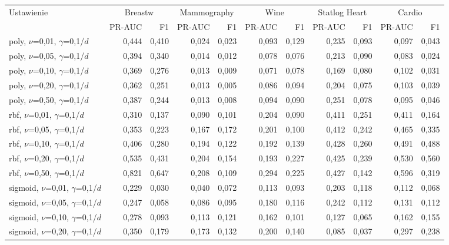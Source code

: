 \begin{longtable}{lrrrrrrrrrr}
\toprule
Ustawienie & \multicolumn{2}{c}{Breastw} & \multicolumn{2}{c}{Mammography} & \multicolumn{2}{c}{Wine} & \multicolumn{2}{c}{Statlog Heart} & \multicolumn{2}{c}{Cardio} \\
 & PR-AUC & F1 & PR-AUC & F1 & PR-AUC & F1 & PR-AUC & F1 & PR-AUC & F1 \\
\midrule
\endhead
poly, $\nu$=0,01, $\gamma$=0,1/$d$ & 0,444 & 0,410 & 0,024 & 0,023 & 0,093 & 0,129 & 0,235 & 0,093 & 0,097 & 0,043 \\
poly, $\nu$=0,05, $\gamma$=0,1/$d$ & 0,394 & 0,340 & 0,014 & 0,012 & 0,078 & 0,076 & 0,213 & 0,090 & 0,083 & 0,024 \\
poly, $\nu$=0,10, $\gamma$=0,1/$d$ & 0,369 & 0,276 & 0,013 & 0,009 & 0,071 & 0,078 & 0,169 & 0,080 & 0,102 & 0,031 \\
poly, $\nu$=0,20, $\gamma$=0,1/$d$ & 0,362 & 0,251 & 0,013 & 0,005 & 0,086 & 0,094 & 0,204 & 0,075 & 0,103 & 0,039 \\
poly, $\nu$=0,50, $\gamma$=0,1/$d$ & 0,387 & 0,244 & 0,013 & 0,008 & 0,094 & 0,090 & 0,251 & 0,078 & 0,095 & 0,046 \\
rbf, $\nu$=0,01, $\gamma$=0,1/$d$ & 0,310 & 0,137 & 0,090 & 0,101 & 0,204 & 0,090 & 0,411 & 0,251 & 0,411 & 0,164 \\
rbf, $\nu$=0,05, $\gamma$=0,1/$d$ & 0,353 & 0,223 & 0,167 & 0,172 & 0,201 & 0,100 & 0,412 & 0,242 & 0,465 & 0,335 \\
rbf, $\nu$=0,10, $\gamma$=0,1/$d$ & 0,406 & 0,280 & 0,194 & 0,122 & 0,192 & 0,139 & 0,428 & 0,260 & 0,491 & 0,488 \\
rbf, $\nu$=0,20, $\gamma$=0,1/$d$ & 0,535 & 0,431 & 0,204 & 0,154 & 0,193 & 0,227 & 0,425 & 0,239 & 0,530 & 0,560 \\
rbf, $\nu$=0,50, $\gamma$=0,1/$d$ & 0,821 & 0,647 & 0,208 & 0,109 & 0,294 & 0,225 & 0,427 & 0,142 & 0,596 & 0,319 \\
sigmoid, $\nu$=0,01, $\gamma$=0,1/$d$ & 0,229 & 0,030 & 0,040 & 0,072 & 0,113 & 0,093 & 0,203 & 0,118 & 0,112 & 0,068 \\
sigmoid, $\nu$=0,05, $\gamma$=0,1/$d$ & 0,247 & 0,058 & 0,086 & 0,095 & 0,180 & 0,116 & 0,242 & 0,112 & 0,131 & 0,112 \\
sigmoid, $\nu$=0,10, $\gamma$=0,1/$d$ & 0,278 & 0,093 & 0,113 & 0,121 & 0,162 & 0,101 & 0,127 & 0,065 & 0,162 & 0,155 \\
sigmoid, $\nu$=0,20, $\gamma$=0,1/$d$ & 0,350 & 0,179 & 0,173 & 0,132 & 0,200 & 0,140 & 0,085 & 0,037 & 0,297 & 0,238 \\

\end{longtable}
